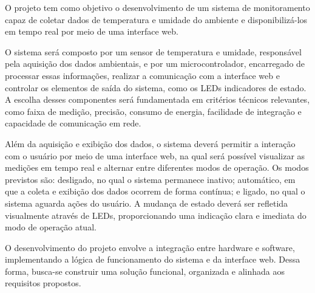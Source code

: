 O  projeto tem como objetivo o desenvolvimento de um sistema de monitoramento capaz de coletar dados de temperatura e umidade do ambiente e disponibilizá-los em tempo real por meio de uma interface web.

O sistema será composto por um sensor de temperatura e umidade, responsável pela aquisição dos dados ambientais, e por um microcontrolador, encarregado de processar essas informações, realizar a comunicação com a interface web e controlar os elementos de saída do sistema, como os LEDs indicadores de estado. A escolha desses componentes será fundamentada em critérios técnicos relevantes, como faixa de medição, precisão, consumo de energia, facilidade de integração e capacidade de comunicação em rede.

Além da aquisição e exibição dos dados, o sistema deverá permitir a interação com o usuário por meio de uma interface web, na qual será possível visualizar as medições em tempo real e alternar entre diferentes modos de operação. Os modos previstos são: desligado, no qual o sistema permanece inativo; automático, em que a coleta e exibição dos dados ocorrem de forma contínua; e ligado, no qual o sistema aguarda ações do usuário. A mudança de estado deverá ser refletida visualmente através de LEDs, proporcionando uma indicação clara e imediata do modo de operação atual.

O desenvolvimento do projeto envolve a integração entre hardware e software, implementando a lógica de funcionamento do sistema e da interface web. Dessa forma, busca-se construir uma solução funcional, organizada e alinhada aos requisitos propostos.

